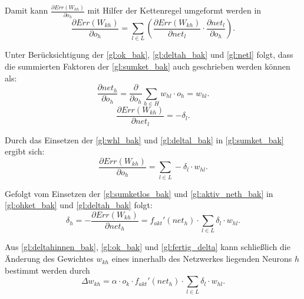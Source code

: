 Damit kann $\frac{\partial Err(W_{kh})}{\partial o_{h}}$ mit Hilfer der Kettenregel umgeformt werden in
\begin{equation}
\frac{\partial Err(W_{kh})}{\partial o_{h}} =\sum\limits_{l \in L} \left (  \frac{\partial Err(W_{kh})}{\partial net_{l}} \cdot \frac{\partial net_{l}}{\partial o_{h}} \right ).
\label{gl:sumket_bak}
\end{equation}

Unter Berücksichtigung der \autoref{gl:ok_bak}, \autoref{gl:deltah_bak} und \autoref{gl:netl} folgt, dass die summierten Faktoren der \autoref{gl:sumket_bak} auch geschrieben werden können als:
\begin{equation}
\frac{\partial net_{h}}{\partial o_{h}} = \frac{\partial }{\partial o_{h}} \sum\limits_{h \in H} w_{hl} \cdot o_{h} = w_{hl} .
\label{gl:whl_bak}
\end{equation}
\begin{equation}
\frac{\partial Err(W_{kh})}{\partial net_{l}} = -\delta_l .
\label{gl:deltal_bak}
\end{equation}

Durch das Einsetzen der \autoref{gl:whl_bak} und \autoref{gl:deltal_bak} in \autoref{gl:sumket_bak} ergibt sich:
\begin{equation}
\frac{\partial Err(W_{kh})}{\partial o_{h}} =\sum\limits_{l \in L}  -\delta_l \cdot w_{hl} .
\label{gl:sumketlos_bak}
\end{equation}

Gefolgt vom Einsetzen der \autoref{gl:sumketlos_bak} und \autoref{gl:aktiv_neth_bak} in \autoref{gl:ohket_bak} und \autoref{gl:deltah_bak} folgt:
\begin{equation}
\delta_{h}= -\frac{\partial Err(W_{kh})}{\partial net_{h}} = f_{akt}'(net_h) \cdot \sum\limits_{l \in L}  \delta_l \cdot w_{hl}.
\label{gl:deltahinnen_bak}
\end{equation}

Aus \autoref{gl:deltahinnen_bak}, \autoref{gl:ok_bak} und \autoref{gl:fertig_delta} kann schließlich die Änderung des Gewichtes $w_{kh}$ eines innerhalb des Netzwerkes liegenden Neurons $h$ bestimmt werden durch
\begin{equation}
\Delta w_{kh} = \alpha \cdot o_{k} \cdot f_{akt}'(net_h) \cdot \sum\limits_{l \in L}  \delta_l \cdot w_{hl}  .
\label{gl:fertiginnen_bak}
\end{equation}

